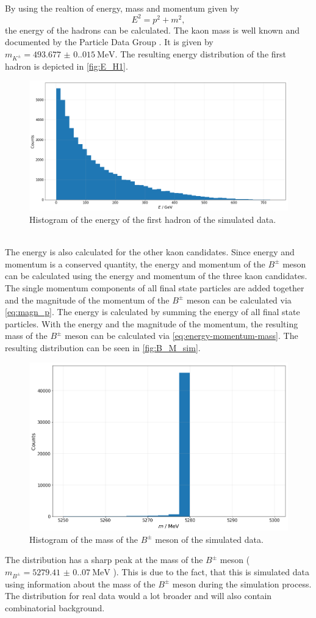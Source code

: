 \\ By using the realtion of energy, mass and momentum given by 
\begin{equation}
  \label{eq:energy-momentum-mass}
  E^2 = p^2 + m^2,
\end{equation}
the energy of the hadrons can be calculated. The kaon mass is well known and documented by the Particle Data Group \cite{PDG}.
It is given by $m_{K^{\pm}} = \qty{493.677(0.015)}{\mega\electronvolt}$. The resulting energy distribution of the first hadron is depicted in  \autoref{fig:E_H1}.
\begin{figure}
  \centering
  \includegraphics[width = .7\textwidth]{"content/pics/E_H1.png"}
  \caption{Histogram of the energy of the first hadron of the simulated data.}
  \label{fig:E_H1}
\end{figure}
\\The energy is also calculated for the other kaon candidates. Since energy and momentum is a conserved quantity, the energy and momentum of the $B^{\pm}$ meson can be calculated
using the energy and momentum of the three kaon candidates. The single momentum components of all final state particles are added together and the magnitude of the momentum of the $B^{\pm}$
meson can be calculated via \autoref{eq:magn_p}. The energy is calculated by summing the energy of all final state particles. With the energy and the magnitude of the momentum, the resulting
mass of the $B^{\pm}$ meson can be calculated via \autoref{eq:energy-momentum-mass}. The resulting distribution can be seen in \autoref{fig:B_M_sim}.
\begin{figure}
  \centering
  \includegraphics[width = .6\textwidth]{"content/pics/B_M_sim.png"}
  \caption{Histogram of the mass of the $B^{\pm}$ meson of the simulated data.}
  \label{fig:B_M_sim}
\end{figure}
The distribution has a sharp peak at the mass of the $B^{\pm}$ meson ($m_{B^{\pm}} = \qty{5279.41(0.07)}{\mega\electronvolt}$ \cite{PDG}). This is due to the fact, that this is simulated data using information about the mass of the $B^{\pm}$ meson during
the simulation process. The distribution for real data would a lot broader and will also contain combinatorial background.

